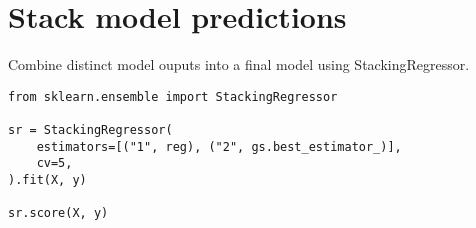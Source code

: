 \documentclass[]{article}
\begin{document}
\section{Stack model predictions}

Combine distinct model ouputs into a final model using StackingRegressor.

\begin{lstlisting}
from sklearn.ensemble import StackingRegressor

sr = StackingRegressor(
	estimators=[("1", reg), ("2", gs.best_estimator_)], 
	cv=5,
).fit(X, y)

sr.score(X, y)
\end{lstlisting}
\end{document}
